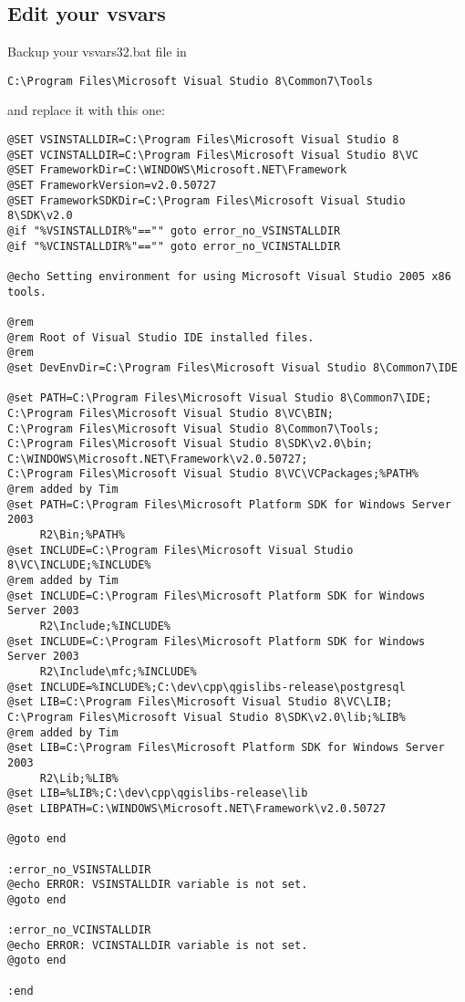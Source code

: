 \subsection{Edit your vsvars}
Backup your vsvars32.bat file in 

\begin{verbatim}
C:\Program Files\Microsoft Visual Studio 8\Common7\Tools
\end{verbatim}

and replace it with this one:

\begin{verbatim}
@SET VSINSTALLDIR=C:\Program Files\Microsoft Visual Studio 8
@SET VCINSTALLDIR=C:\Program Files\Microsoft Visual Studio 8\VC
@SET FrameworkDir=C:\WINDOWS\Microsoft.NET\Framework
@SET FrameworkVersion=v2.0.50727
@SET FrameworkSDKDir=C:\Program Files\Microsoft Visual Studio 8\SDK\v2.0
@if "%VSINSTALLDIR%"=="" goto error_no_VSINSTALLDIR
@if "%VCINSTALLDIR%"=="" goto error_no_VCINSTALLDIR

@echo Setting environment for using Microsoft Visual Studio 2005 x86 tools.

@rem
@rem Root of Visual Studio IDE installed files.
@rem
@set DevEnvDir=C:\Program Files\Microsoft Visual Studio 8\Common7\IDE

@set PATH=C:\Program Files\Microsoft Visual Studio 8\Common7\IDE;
C:\Program Files\Microsoft Visual Studio 8\VC\BIN;
C:\Program Files\Microsoft Visual Studio 8\Common7\Tools;
C:\Program Files\Microsoft Visual Studio 8\SDK\v2.0\bin;
C:\WINDOWS\Microsoft.NET\Framework\v2.0.50727;
C:\Program Files\Microsoft Visual Studio 8\VC\VCPackages;%PATH%
@rem added by Tim
@set PATH=C:\Program Files\Microsoft Platform SDK for Windows Server 2003 
     R2\Bin;%PATH%
@set INCLUDE=C:\Program Files\Microsoft Visual Studio 8\VC\INCLUDE;%INCLUDE%
@rem added by Tim
@set INCLUDE=C:\Program Files\Microsoft Platform SDK for Windows Server 2003 
     R2\Include;%INCLUDE%
@set INCLUDE=C:\Program Files\Microsoft Platform SDK for Windows Server 2003 
     R2\Include\mfc;%INCLUDE%
@set INCLUDE=%INCLUDE%;C:\dev\cpp\qgislibs-release\postgresql
@set LIB=C:\Program Files\Microsoft Visual Studio 8\VC\LIB;
C:\Program Files\Microsoft Visual Studio 8\SDK\v2.0\lib;%LIB%
@rem added by Tim
@set LIB=C:\Program Files\Microsoft Platform SDK for Windows Server 2003 
     R2\Lib;%LIB%
@set LIB=%LIB%;C:\dev\cpp\qgislibs-release\lib
@set LIBPATH=C:\WINDOWS\Microsoft.NET\Framework\v2.0.50727

@goto end

:error_no_VSINSTALLDIR
@echo ERROR: VSINSTALLDIR variable is not set. 
@goto end

:error_no_VCINSTALLDIR
@echo ERROR: VCINSTALLDIR variable is not set. 
@goto end

:end

\end{verbatim}

